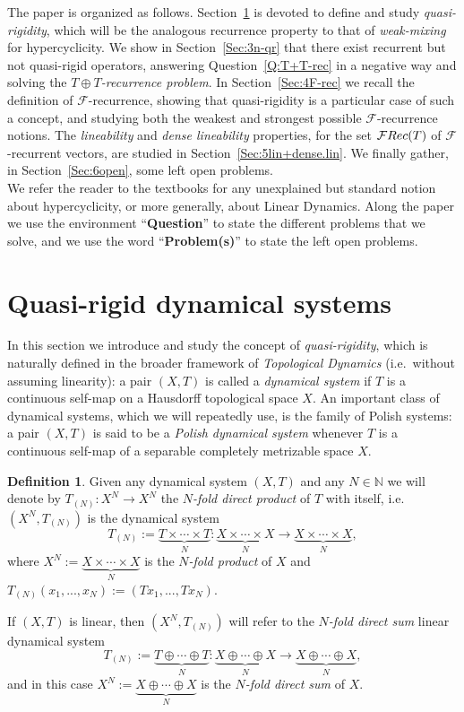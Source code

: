 \documentclass[openright,11pt]{article}
\theoremstyle{plain}
\theoremstyle{definition}
\newtheorem{definition}[theorem]{Definition}
\newcommand{\NN}{\mathbb{N}}
\newcommand{\Fc}{\mathcal{F}}
\newcommand{\Rec}{\textup{Rec}}
\begin{document}
The paper is organized as follows. Section~\ref{Sec:2qr} is devoted to define and study {\em quasi-rigidity}, which will be the analogous recurrence property to that of {\em weak-mixing} for hypercyclicity. We show in Section~\ref{Sec:3n-qr} that there exist recurrent but not quasi-rigid operators, answering Question~\ref{Q:T+T-rec} in a negative way and solving the {\em $T\oplus T$-recurrence problem}. In Section~\ref{Sec:4F-rec} we recall the definition of $\Fc$-recurrence, showing that quasi-rigidity is a particular case of such a concept, and studying both the weakest and strongest possible $\Fc$-recurrence notions. The {\em lineability} and {\em dense lineability} properties, for the set $\Fc\Rec(T)$ of $\Fc$-recurrent vectors, are studied in Section~\ref{Sec:5lin+dense.lin}. We finally gather, in Section~\ref{Sec:6open}, some left open problems.\\[-5pt]

We refer the reader to the textbooks \cite{BaMa2009_book,GrPe2011_book} for any unexplained but standard notion about hypercyclicity, or more generally, about Linear Dynamics. Along the paper we use the environment ``\textbf{Question}'' to state the different problems that we solve, and we use the word ``\textbf{Problem(s)}'' to state the left open problems.

\section{Quasi-rigid dynamical systems}\label{Sec:2qr}

In this section we introduce and study the concept of {\em quasi-rigidity}, which is naturally defined in the broader framework of {\em Topological Dynamics} (i.e.\ without assuming linearity): a pair $(X,T)$ is called a {\em dynamical system} if $T$ is a continuous self-map on a Hausdorff topological space $X$. An important class of dynamical systems, which we will repeatedly use, is the family of Polish systems: a pair $(X,T)$ is said to be a {\em Polish dynamical system} whenever $T$ is a continuous self-map of a separable completely metrizable space $X$.

\begin{definition}
	Given any dynamical system $(X,T)$ and any $N \in \NN$ we will denote by $T_{(N)}:X^N\longrightarrow X^N$ the {\em $N$-fold direct product} of $T$ with itself, i.e.\ $(X^N,T_{(N)})$ is the dynamical system
	\[
	T_{(N)} := \underbrace{T\times\cdots\times T}_{N} : \underbrace{X\times\cdots\times X}_{N} \longrightarrow \underbrace{X\times\cdots\times X}_{N},
	\]
	where $X^N:=\underbrace{X\times\cdots\times X}_{N}$ is the {\em $N$-fold product} of $X$ and $T_{(N)}(x_1,...,x_N) := (Tx_1,...,Tx_N)$.
\end{definition}
If $(X,T)$ is linear, then $(X^N,T_{(N)})$ will refer to the {\em $N$-fold direct sum} linear dynamical system
\[
T_{(N)} := \underbrace{T\oplus\cdots\oplus T}_{N} : \underbrace{X\oplus\cdots\oplus X}_{N} \longrightarrow \underbrace{X\oplus\cdots\oplus X}_{N},
\]
and in this case $X^N:=\underbrace{X\oplus\cdots\oplus X}_{N}$ is the {\em $N$-fold direct sum} of $X$.
\end{document}

